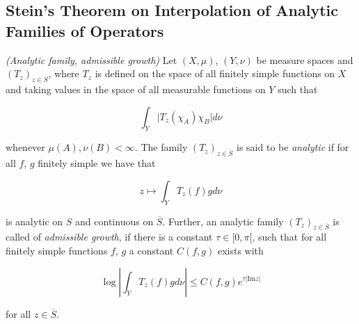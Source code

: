 \subsection{Stein's Theorem on Interpolation of Analytic Families of Operators}

\begin{mdframed}
	\begin{definition}\emph{(Analytic family, admissible growth)}
		Let $(X,\mu)$, $(Y,\nu)$ be measure spaces and $\left( T_z \right)_{z \in \overline{S}}$, where $T_z$ is defined on the space of all finitely simple functions on $X$ and taking values in the space of all measurable functions on $Y$ such that

		\begin{equation}
			\int_Y \vert T_z(\chi_A)\chi_B \vert d\nu
		\end{equation}

		whenever $\mu(A),\nu(B) < \infty$. The family $\left( T_z \right)_{z \in \overline{S}}$ is said to be \emph{analytic} if for all $f$, $g$ finitely simple we have that

		\begin{equation}
			z \mapsto \int_Y T_z(f)gd\nu
		\end{equation}

		is analytic on $S$ and continuous on $\overline{S}$. Further, an analytic family $\left( T_z \right)_{z \in \overline{S}}$ is called of \emph{admissible growth}, if there is a constant $\tau \in [0,\pi[$, such that for all finitely simple functions $f$, $g$ a constant $C(f,g)$ exists with

			\begin{equation}
				\log\left\vert \int_Y T_z(f) g d\nu\right\vert \leqslant C(f,g)e^{\tau\vert \mathrm{Im}z\vert}
			\end{equation}

			for all $z \in \overline{S}$.
	\end{definition}
\end{mdframed}

\vspace{2mm}


